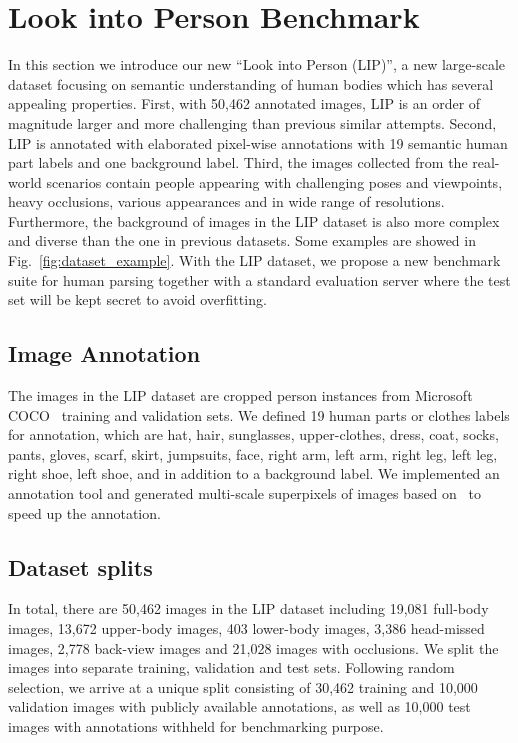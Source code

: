 \documentclass[10pt,twocolumn,letterpaper]{article}
\begin{document}
\section{Look into Person Benchmark}
In this section we introduce our new ``Look into Person (LIP)'', a new large-scale dataset focusing on semantic understanding of human bodies which has several appealing properties. First, with 50,462 annotated images, LIP is an order of magnitude larger and more challenging than previous similar attempts\cite{yamaguchi2012parsing,chen2014detect,Co-CNN}. Second, LIP is annotated with elaborated pixel-wise annotations with 19 semantic human part labels and one background label. Third, the images collected from the real-world scenarios contain people appearing with challenging poses and viewpoints, heavy occlusions, various appearances and in wide range of resolutions. Furthermore, the background of images in the LIP dataset is also more complex and diverse than the one in previous datasets. Some examples are showed in Fig.~\ref{fig:dataset_example}. With the LIP dataset, we propose a new benchmark suite for human parsing together with a standard evaluation server where the test set will be kept secret to avoid overfitting.
\subsection{Image Annotation}
The images in the LIP dataset are cropped person instances from Microsoft COCO~\cite{DBLP:journals/corr/LinMBHPRDZ14} training and validation sets. We defined 19 human parts or clothes labels for annotation, which are hat, hair, sunglasses, upper-clothes, dress, coat, socks, pants, gloves, scarf, skirt, jumpsuits, face, right arm, left arm, right leg, left leg, right shoe, left shoe, and in addition to a background label. We implemented an annotation tool and generated multi-scale superpixels of images based on~\cite{amfm_pami2011} to speed up the annotation.
\subsection{Dataset splits}
In total, there are 50,462 images in the LIP dataset including 19,081 full-body images, 13,672 upper-body images, 403 lower-body images, 3,386 head-missed images, 2,778 back-view images and 21,028 images with occlusions. We split the images into separate training, validation and test sets. Following random selection, we arrive at a unique split consisting of 30,462 training and 10,000 validation images with publicly available annotations, as well as 10,000 test images with annotations withheld for benchmarking purpose. 
\end{document}

